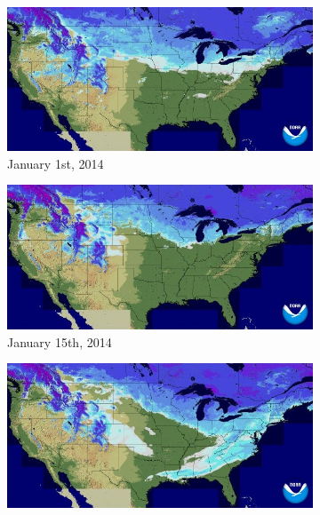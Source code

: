 \documentclass[10pt,twocolumn,letterpaper]{article}
\begin{document}
\begin{figure}
  \centering
  \begin{subfigure}[b]{0.33\textwidth}
    \centering
		\includegraphics[width=\textwidth, trim= 0mm 0mm 0mm 0mm]{figs/snow_gt_1.jpg}
    \caption{January 1st, 2014}
    \label{fig:snow_map_gt_1}
  \end{subfigure}
  \begin{subfigure}[b]{0.33\textwidth}
    \centering
		\includegraphics[width=\textwidth, trim= 0mm 0mm 0mm 0mm]{figs/snow_gt_2.jpg}
    \caption{January 15th, 2014}
    \label{fig:snow_map_gt_2}
  \end{subfigure}
  \begin{subfigure}[b]{0.33\textwidth}
    \centering
		\includegraphics[width=\textwidth, trim= 0mm 0mm 0mm 0mm]{figs/snow_gt_3.jpg}

\end{subfigure}
\end{figure}
\end{document}
